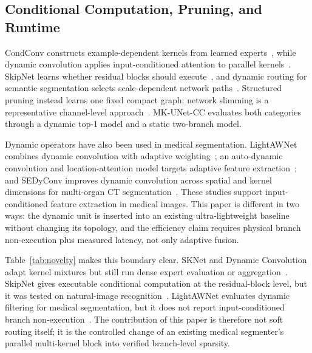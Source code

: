\documentclass[conference]{IEEEtran}
\begin{document}
\subsection{Conditional Computation, Pruning, and Runtime}
CondConv constructs example-dependent kernels from learned experts~\cite{yang2019condconv}, while dynamic convolution applies input-conditioned attention to parallel kernels~\cite{chen2020dynamicconv}. SkipNet learns whether residual blocks should execute~\cite{wang2018skipnet}, and dynamic routing for semantic segmentation selects scale-dependent network paths~\cite{li2020dynamicrouting}. Structured pruning instead learns one fixed compact graph; network slimming is a representative channel-level approach~\cite{liu2017slimming}. MK-UNet-CC evaluates both categories through a dynamic top-1 model and a static two-branch model.

Dynamic operators have also been used in medical segmentation. LightAWNet combines dynamic convolution with adaptive weighting~\cite{wang2025lightawnet}; an auto-dynamic convolution and location-attention model targets adaptive feature extraction~\cite{wang2025adlaformer}; and SEDyConv improves dynamic convolution across spatial and kernel dimensions for multi-organ CT segmentation~\cite{hao2025sedyconv}. These studies support input-conditioned feature extraction in medical images. This paper is different in two ways: the dynamic unit is inserted into an existing ultra-lightweight baseline without changing its topology, and the efficiency claim requires physical branch non-execution plus measured latency, not only adaptive fusion.

Table~\ref{tab:novelty} makes this boundary clear. SKNet and Dynamic Convolution adapt kernel mixtures but still run dense expert evaluation or aggregation~\cite{li2019sknet,chen2020dynamicconv}. SkipNet gives executable conditional computation at the residual-block level, but it was tested on natural-image recognition~\cite{wang2018skipnet}. LightAWNet evaluates dynamic filtering for medical segmentation, but it does not report input-conditioned branch non-execution~\cite{wang2025lightawnet}. The contribution of this paper is therefore not soft routing itself; it is the controlled change of an existing medical segmenter's parallel multi-kernel block into verified branch-level sparsity.
\end{document}
